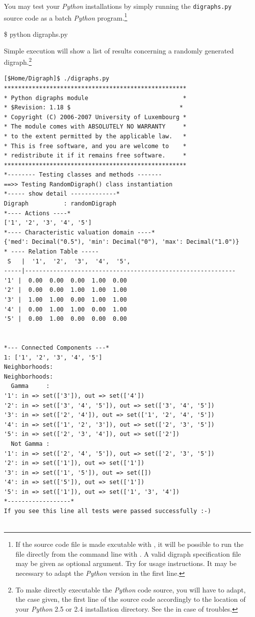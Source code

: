 \documentclass{article}
\newcommand{\+}{\verb+}
\renewcommand{\*}{\back{}}
\newcommand{\Py}{\emph{Python}\xspace }
\begin{document}
\begin{center}
You may test your \Py installations  by simply running the \+digraphs.py+ source code as a batch \Py program.\footnote{If the source code file  is made excutable with , it will be possible to run the file directly from the command line with  . A valid digraph specification file may be given as optional argument. Try  for usage instructions. It may be necessary to adapt the \Py version in the first line.}
\begin{example}
\$ python digraphs.py
\end{example}
Simple execution will show a list of results concerning a randomly generated digraph.\footnote{To make directly executable the \Py code source, you will have to adapt, the case given, the first line of the source code accordingly to the location of your \Py 2.5 or 2.4  installation directory. See the \xlink{\Py documentation pages}{http://www.python.org/doc} in case of troubles.} 
\begin{example}
\begin{verbatim}
[$Home/Digraph]$ ./digraphs.py
****************************************************
* Python digraphs module                           *
* $Revision: 1.18 $                               *
* Copyright (C) 2006-2007 University of Luxembourg *
* The module comes with ABSOLUTELY NO WARRANTY     *
* to the extent permitted by the applicable law.   *
* This is free software, and you are welcome to    *
* redistribute it if it remains free software.     *
****************************************************
*-------- Testing classes and methods -------
==>> Testing RandomDigraph() class instantiation 
*----- show detail -------------*
Digraph          : randomDigraph
*---- Actions ----*
['1', '2', '3', '4', '5']
*---- Characteristic valuation domain ----*
{'med': Decimal("0.5"), 'min': Decimal("0"), 'max': Decimal("1.0")}
* ---- Relation Table -----
 S   |  '1',  '2',  '3',  '4',  '5',  
-----|------------------------------------------------------------
'1' |  0.00  0.00  0.00  1.00  0.00 
'2' |  0.00  0.00  1.00  1.00  1.00 
'3' |  1.00  1.00  0.00  1.00  1.00 
'4' |  0.00  1.00  1.00  0.00  1.00 
'5' |  0.00  1.00  0.00  0.00  0.00 


*--- Connected Components ---*
1: ['1', '2', '3', '4', '5']
Neighborhoods:
Neighborhoods:
  Gamma     :
'1': in => set(['3']), out => set(['4'])
'2': in => set(['3', '4', '5']), out => set(['3', '4', '5'])
'3': in => set(['2', '4']), out => set(['1', '2', '4', '5'])
'4': in => set(['1', '2', '3']), out => set(['2', '3', '5'])
'5': in => set(['2', '3', '4']), out => set(['2'])
  Not Gamma :
'1': in => set(['2', '4', '5']), out => set(['2', '3', '5'])
'2': in => set(['1']), out => set(['1'])
'3': in => set(['1', '5']), out => set([])
'4': in => set(['5']), out => set(['1'])
'5': in => set(['1']), out => set(['1', '3', '4'])
*------------------*
If you see this line all tests were passed successfully :-)


\end{verbatim}
\end{example}
\end{center}
\end{document}
